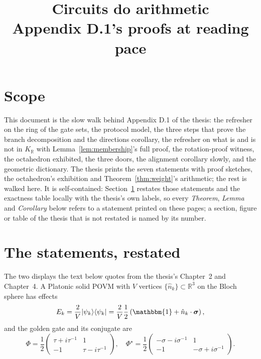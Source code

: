 \documentclass[11pt,a4paper]{article}
\title{\bfseries Circuits do arithmetic\\[2mm]
\large Appendix D.1's proofs at reading pace}
\author{}
\date{}
\newcommand{\R}{\mathbb{R}}
\newcommand{\Id}{\mathbbm{1}}
\newcommand{\sigmavec}{\boldsymbol{\sigma}}
\newcommand{\phig}{\tau}      %
\newcommand{\invphig}{\sigma} %
\newcommand{\ketbra}[2]{|#1\rangle\langle#2|}
\begin{document}
\maketitle
\vspace{-12mm}

\section*{Scope}

This document is the slow walk behind Appendix D.1 of the thesis: the refresher on the ring of the gate sets, the protocol model, the three steps that prove the branch decomposition and the directions corollary, the refresher on what is and is not in $K_\R$ with Lemma~\ref{lem:membership}'s full proof, the rotation-proof witness, the octahedron exhibited, the three doors, the alignment corollary slowly, and the geometric dictionary. The thesis prints the seven statements with proof sketches, the octahedron's exhibition and Theorem~\ref{thm:weight}'s arithmetic; the rest is walked here. It is self-contained: Section~\ref{sec:statements} restates those statements and the exactness table locally with the thesis's own labels, so every \emph{Theorem}, \emph{Lemma} and \emph{Corollary} below refers to a statement printed on these pages; a section, figure or table of the thesis that is not restated is named by its number.

\section{The statements, restated}\label{sec:statements}

The two displays the text below quotes from the thesis's Chapter~2 and Chapter~4. A Platonic solid POVM with $V$ vertices $\{\hat n_k\} \subset \R^3$ on the Bloch sphere has effects
\begin{equation} \label{eq:povmform}
E_k = \frac{2}{V} \ketbra{\psi_k}{\psi_k} = \frac{2}{V} \frac12 \left( \Id + \hat{n}_k \cdot \sigmavec \right),
\end{equation}
and the golden gate and its conjugate are
\begin{equation}\label{eq:golden-gate}
    \Phi = \frac{1}{2} \begin{pmatrix} \phig + i\phig^{-1} & 1 \\ -1 & \phig - i\phig^{-1} \end{pmatrix}, \quad \Phi^\star = \frac{1}{2} \begin{pmatrix} -\invphig - i\invphig^{-1} & 1 \\ -1 & -\invphig + i\invphig^{-1} \end{pmatrix}.
\end{equation}
\end{document}
